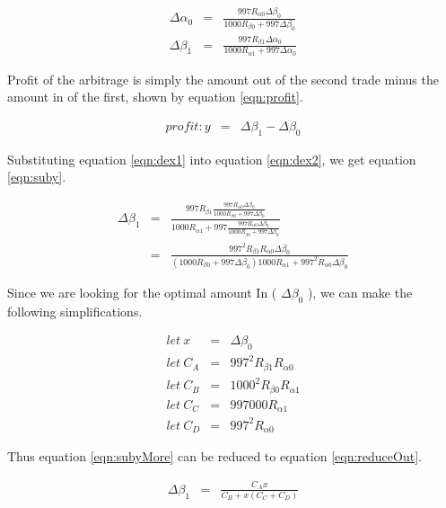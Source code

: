 \documentclass[runningheads]{llncs}
\begin{document}
	\begin{eqnarray}
		 \Delta\alpha_{0}  &=& \frac{997 R_{\alpha 0} \Delta\beta_{0} }{1000 R_{\beta 0} + 997 \Delta\beta_{0}} \label{eqn:dex1}\\
		 \Delta\beta_{1}  &=& \frac{997 R_{\beta 1} \Delta\alpha_{0} }{1000 R_{\alpha 1} + 997 \Delta\alpha_{0}} \label{eqn:dex2}
	\end{eqnarray}
	
	Profit of the arbitrage is simply the amount out of the second trade minus the amount in of the first, shown by equation \ref{eqn:profit}.
	
	\begin{eqnarray}
		profit: y  &=& \Delta\beta_{1} - \Delta\beta_{0} \label{eqn:profit}
	\end{eqnarray}
	
	
	Substituting equation \ref{eqn:dex1} into equation \ref{eqn:dex2}, we get equation \ref{eqn:suby}.
	
	\begin{eqnarray}
		\Delta\beta_{1}  &=& \frac{997 R_{\beta 1} \frac{997 R_{\alpha 0} \Delta\beta_{0} }{1000 R_{\beta 0} + 997 \Delta\beta_{0}} }{1000 R_{\alpha 1} + 997 \frac{997 R_{\alpha 0} \Delta\beta_{0} }{1000 R_{\beta 0} + 997 \Delta\beta_{0}}} \label{eqn:suby}\\
		&=& \frac{997^2 R_{\beta 1}  R_{\alpha 0} \Delta\beta_{0} }{(1000 R_{\beta 0} + 997 \Delta\beta_{0}) 1000 R_{\alpha 1} + 997^2 R_{\alpha 0} \Delta\beta_{0} } \label{eqn:subyMore}
	\end{eqnarray}
	
	Since we are looking for the optimal amount In ( \(\Delta\beta_{0}\) ), we can make the following simplifications.
	
	\begin{eqnarray}
		let \: x &=& \Delta\beta_{0}\\
		let \: C_{A} &=& 997^2 R_{\beta 1}  R_{\alpha 0}\\
		let \: C_{B} &=& 1000^2 R_{\beta 0} R_{\alpha 1}\\
		let \: C_{C} &=& 997000  R_{\alpha 1}\\
		let \: C_{D} &=& 997^2  R_{\alpha 0}
	\end{eqnarray}
	
	Thus equation \ref{eqn:subyMore} can be reduced to equation \ref{eqn:reduceOut}.
	
	\begin{eqnarray}
		\Delta\beta_{1}  &=& \frac{C_{A} x}{C_{B} + x(C_{C} + C_{D})} \label{eqn:reduceOut}
	\end{eqnarray}
	
\end{document}
